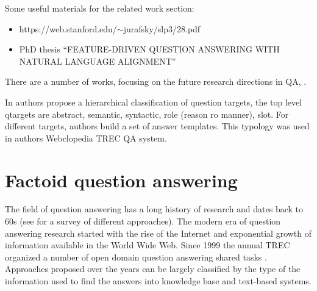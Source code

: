 %

\label{chap:related}


Some useful materials for the related work section:
\begin{itemize}
\item https://web.stanford.edu/$\sim$jurafsky/slp3/28.pdf
\item PhD thesis ``FEATURE-DRIVEN QUESTION ANSWERING WITH NATURAL LANGUAGE ALIGNMENT''
\end{itemize}





There are a number of works, focusing on the future research directions in QA, \eg \cite{burger2001issues}.

In \cite{Hovy:2002:QTS:1289189.1289206} authors propose a hierarchical classification of question targets, the top level qtargets are abstract, semantic, syntactic, role (reason ro manner), slot. For different targets, authors build a set of answer templates. This typology was used in authors Webclopedia TREC QA system.




\section{Factoid question answering}

The field of question answering has a long history of research and dates back to 60s (see \cite{Kolomiyets:2011:SQA:2046840.2047162} for a survey of different approaches).
The modern era of question answering research started with the rise of the Internet and exponential growth of information available in the World Wide Web.
Since 1999 the annual TREC organized a number of open domain question answering shared tasks \cite{dang2007overview}.
Approaches proposed over the years can be largely classified by the type of the information used to find the answers into knowledge base and text-based systems.

